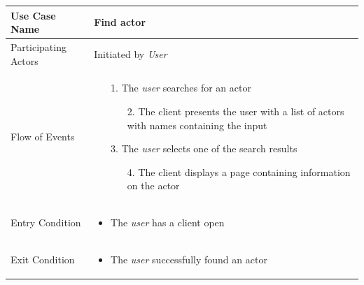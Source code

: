 \begin{center}
	\begin{tabular}{ | l | p{10cm} |  }
		 \hline
		Use Case Name & Find actor \\ \hline
		Participating Actors & Initiated by \emph{User} \\ \hline
		Flow of Events & \begin{enumerate}
						\item[1.] The \emph{user} searches for an actor
						\begin{enumerate}
							\item[2.] The client presents the user with a list of actors with names containing the input
						\end{enumerate}
						\item[3.] The \emph{user} selects one of the search results
						\begin{enumerate}
							\item[4.] The client displays a page containing information on the actor
						\end{enumerate}
					\end{enumerate} \\ \hline
		Entry Condition & \begin{itemize}
						\item The \emph{user} has a client open
					\end{itemize} \\ \hline
		Exit Condition & \begin{itemize}
						\item The \emph{user} successfully found an actor
					\end{itemize} \\
		\hline
	\end{tabular}
\end{center}

